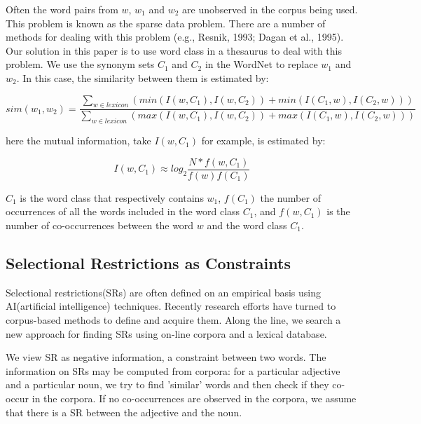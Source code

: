 \clearpage
Often the word pairs from $w$, $w_1$ and $w_2$ are unobserved in the
corpus being used.  This problem is known as the sparse data problem.   
There are a number of methods for dealing with this problem  
(e.g., Resnik, 1993; Dagan et al., 1995).  
Our solution in this paper is to use word class in a thesaurus to
deal with this problem. We use the synonym sets $C_1$ and $C_2$
in the WordNet to replace $w_1$ and $w_2$.
In this case, the similarity between them is estimated by:

\vspace*{2mm}    

\begin{equation}
  sim(w_1,w_2) = \frac{\sum_{w \in lexicon}(min(I(w,C_1),I(w,C_2))+
min(I(C_1,w),I(C_2,w)))}{\sum_{w \in lexicon}(max(I(w,C_1),I(w,C_2))+
max(I(C_1,w),I(C_2,w)))}
\end{equation}


\vspace*{4mm}
\hspace*{-4mm}here the mutual information, take $I(w,C_1)$ for example, is estimated
by:

\vspace*{2mm}
\begin{equation}
I(w,C_1)\approx log_2 \frac{N*f(w,C_1)}{f(w)f(C_1)}
\end{equation}

\vspace*{4mm}
\hspace*{-5mm}$C_1$ is the word class that respectively contains $w_1$, $f(C_1)$ the
number of occurrences of all the words included in the word class $C_1$, 
and $f(w,C_1)$ is the number of
co-occurrences between the word $w$ and the word class $C_1$. 


\subsection{Selectional Restrictions as Constraints}

   Selectional restrictions(SRs) are often defined on an empirical basis 
using AI(artificial intelligence) techniques. Recently research
efforts have turned to corpus-based methods to define and acquire them. 
Along the line, we search a new approach for finding SRs using on-line corpora and 
a lexical database. 

   We view SR as negative information, a constraint between two
words. The information on SRs may be computed from  corpora: for a particular
adjective and a particular noun, we try to find 'similar' words and then check if they
co-occur in the corpora.  If no co-occurrences are observed in the
corpora, we assume that there is a SR between the adjective and the noun.

